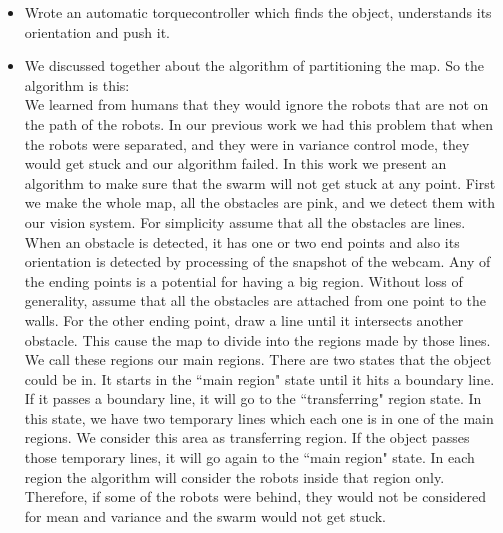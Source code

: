 \begin{itemize}
\item Wrote an automatic torquecontroller which finds the object, understands its orientation and push it.
\item We discussed together about the algorithm of partitioning the map.
So the algorithm is this:\\
We learned from humans that they would ignore the robots that are not on the path of the robots. In our previous work we had this problem that when the robots were separated, and they were in variance control mode, they would get stuck and our algorithm failed. In this work we present an algorithm to make sure that the swarm will not get stuck at any point. First we make the whole map, all the obstacles are pink, and we detect them with our vision system. For simplicity assume that all the obstacles are lines. When an obstacle is detected, it has one or two end points and also its orientation is detected by processing of the snapshot of the webcam. Any of the ending points is a potential for having a big region. Without loss of generality, assume that all the obstacles are attached from one point to the walls. For the other ending point, draw a line until it intersects another obstacle. This cause the map to divide into the regions made by those lines. We call these regions our main regions. There are two states that the object could be in. It starts in the ``main region" state until it hits a boundary line. If it passes a boundary line, it will go to the ``transferring" region state. In this state, we have two temporary lines which each one is in one of the main regions. We consider this area as transferring region. If the object passes those temporary lines, it will go again to the ``main region" state. In each region the algorithm will consider the robots inside that region only. Therefore, if some of the robots were behind, they would not be considered for mean and variance and the swarm would not get stuck.


\end{itemize}
